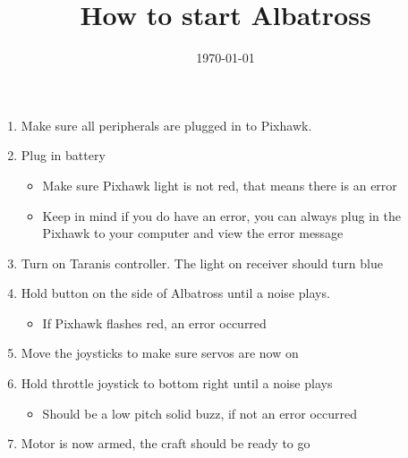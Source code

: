 \documentclass[a4paper]{article}
\title{How to start Albatross}
\date{\today}
\begin{document}
\maketitle

\begin{enumerate}

\item Make sure all peripherals are plugged in to Pixhawk.
\item Plug in battery

	\begin{itemize}
	\item Make sure Pixhawk light is not red, that means there is an error
	\item Keep in mind if you do have an error, you can always plug in the Pixhawk to your computer and view the error message
	\end{itemize}

\item Turn on Taranis controller. The light on receiver should turn blue
\item Hold button on the side of Albatross until a noise plays.

	\begin{itemize}
	\item If Pixhawk flashes red, an error occurred
	\end{itemize}
	
\item Move the joysticks to make sure servos are now on
\item Hold throttle joystick to bottom right until a noise plays

	\begin{itemize}
	\item Should be a low pitch solid buzz, if not an error occurred
	\end{itemize}
	
\item Motor is now armed, the craft should be ready to go

\end{enumerate}
\end{document}
